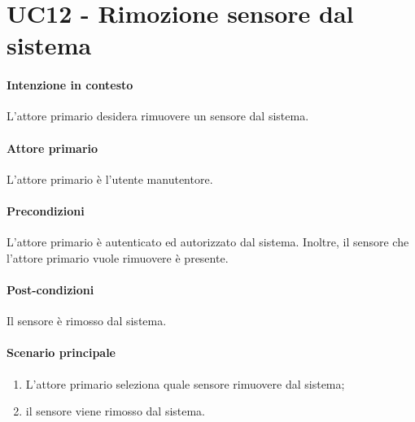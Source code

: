 \section{UC12 - Rimozione sensore dal sistema}\label{uc:12}


\paragraph{Intenzione in contesto}
L'attore primario desidera rimuovere un sensore dal sistema.
\paragraph{Attore primario}L'attore primario è l'utente manutentore.

\paragraph{Precondizioni} L'attore primario è autenticato ed autorizzato dal sistema. Inoltre, il sensore che l'attore primario vuole rimuovere è presente.

\paragraph{Post-condizioni} Il sensore è rimosso dal sistema.
\paragraph{Scenario principale}
\begin{enumerate}
    \item L'attore primario seleziona quale sensore rimuovere dal sistema;
    \item il sensore viene rimosso dal sistema.
\end{enumerate}